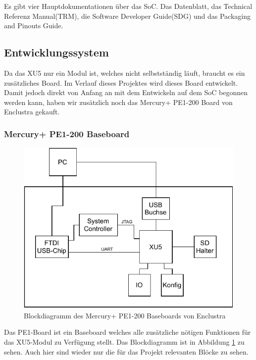 \documentclass{article}
\begin{document}
Es gibt vier Hauptdokumentationen über das SoC. Das Datenblatt, das Technical Referenz Manual(TRM), die Software Developer Guide(SDG) und das Packaging and Pinouts Guide.


\subsection{Entwicklungssystem}
Da das XU5 nur ein Modul ist, welches nicht selbstständig läuft, braucht es ein zusätzliches Board. Im Verlauf dieses Projektes wird dieses Board entwickelt. Damit jedoch direkt von Anfang an mit dem Entwickeln auf dem SoC begonnen werden kann, haben wir zusätzlich noch das Mercury+ PE1-200 Board von Enclustra gekauft. 

\subsubsection*{Mercury+ PE1-200 Baseboard}
\begin{figure}[tb]
    \includegraphics[width=\linewidth]{drawio/bd_pe1}
    \caption{Blockdiagramm des Mercury+ PE1-200 Baseboards von Enclustra}
    \label{fig:bd_pe1}
\end{figure}
Das PE1-Board ist ein Baseboard welches alle zusätzliche nötigen Funktionen für das XU5-Modul zu Verfügung stellt.
Das Blockdiagramm ist in Abbildung \ref{fig:bd_pe1} zu sehen. Auch hier sind wieder nur die für das Projekt relevanten Blöcke zu sehen. 
\end{document}
